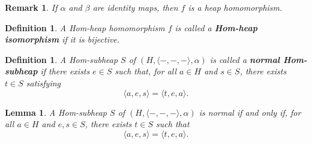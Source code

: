 \documentclass[14pt]{article}
\newtheorem{lemma}[thm]{Lemma}
\theoremstyle{Definition}
\newtheorem{Def}[thm]{Definition}
\newtheorem{Rem}[thm]{Remark}
\theoremstyle{remark}
\begin{document}
\begin{Rem}
If $\alpha$ and $\beta$ are identity maps, then $f$ is a heap homomorphism.
\end{Rem}

\begin{Def}
A Hom-heap homomorphism $f$ is called a \textbf{Hom-heap isomorphism} if it is bijective.
\end{Def}
\begin{Def}
A Hom-subheap $S$ of $(H, \langle -,-,- \rangle, \alpha)$ is called a \textbf{normal Hom-subheap} if there exists $e \in S$ such that, for all $a \in H$ and $s \in S$, there exists $t \in S$ satisfying
\begin{equation}\label{eq12}
\langle a, e, s \rangle = \langle t, e, a \rangle.
\end{equation}
\end{Def}

\begin{lemma}
A Hom-subheap $S$ of $(H, \langle -,-,- \rangle, \alpha)$ is normal if and only if, for all $a \in H$ and $e, s \in S$, there exists $t \in S$ such that
\[
\langle a, e, s \rangle = \langle t, e, a \rangle.
\]
\end{lemma}
\end{document}
